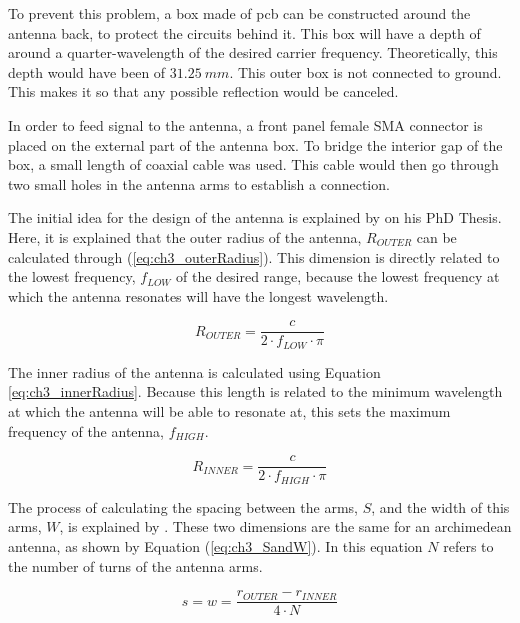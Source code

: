 \par To prevent this problem, a box made of \ac{pcb} can be constructed around the antenna back, to protect the circuits behind it. This box will have a depth of around a quarter-wavelength of the desired carrier frequency. Theoretically, this depth would have been of $31.25\:\si{mm}$. This outer box is not connected to ground. This makes it so that any possible reflection would be canceled. 

\par In order to feed signal to the antenna, a front panel female SMA  connector is placed on the external part of the antenna box. To bridge the interior gap of the box, a small length of coaxial cable was used. This cable would then go through two small holes in the antenna arms to establish a connection.

\par The initial idea for the design of the antenna is explained by \citet{Caswell2002DesignSizes} on his PhD Thesis. Here, it is explained that the outer radius of the antenna, $R_{OUTER}$ can be calculated through (\ref{eq:ch3_outerRadius}). This dimension is directly related to the lowest frequency, $f_{LOW}$ of the desired range, because the lowest frequency at which the antenna resonates will have the longest wavelength.

\begin{equation}
    \label{eq:ch3_outerRadius}
    R_{OUTER} = \frac{c}{2\cdot f_{LOW}\cdot\pi}
\end{equation}

\par The inner radius of the antenna is calculated using Equation \ref{eq:ch3_innerRadius}. Because this length is related to the minimum wavelength at which the antenna will be able to resonate at, this sets the maximum frequency of the antenna, $f_{HIGH}$.

\begin{equation}
    \label{eq:ch3_innerRadius}
    R_{INNER} = \frac{c}{2\cdot f_{HIGH}\cdot\pi}
\end{equation}

\par The process of calculating the spacing between the arms, $S$, and the width of this arms, $W$, is explained by \cite{Caswell2002DesignSizes}. These two dimensions are the same for an archimedean antenna, as shown by Equation (\ref{eq:ch3_SandW}). In this equation $N$ refers to the number of turns of the antenna arms.

\begin{equation}
    \label{eq:ch3_SandW}
    s = w = \frac{r_{OUTER}-r_{INNER}}{4\cdot N}
\end{equation}

